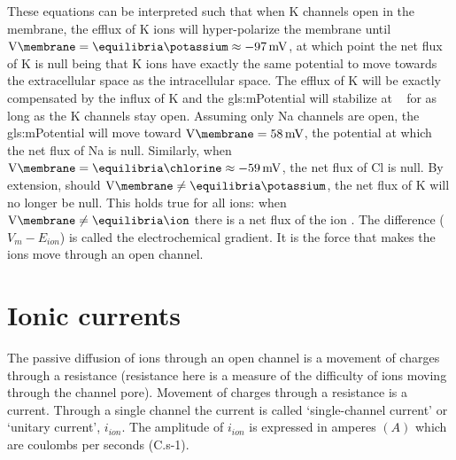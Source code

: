 \documentclass[../../Orator]{subfiles}
\begin{document}
These equations can be interpreted such that when
\gls{K} channels open in the membrane, the efflux of \gls{K} ions will hyper-polarize the membrane until \(\unit{\V\membrane} = \unit{\equilibria\potassium} \approx \qty{-97}{\mV}\), at which point the net flux of \gls{K} is null being that \gls{K} ions have exactly the same potential to move towards the extracellular space as the intracellular space. 
The efflux of \gls{K} will be exactly compensated by the influx of \gls{K} and the \gls{gls:mPotential} will stabilize at \unit{\equilibria\potassium} for as long as the \gls{K} channels stay open. 
Assuming only \gls{Na} channels are open, the \gls{gls:mPotential} will move toward \(\unit{\V\membrane} = \qty{58}{\mV}\), the potential at which the net flux of \gls{Na} is null. 
Similarly, when \(\unit{\V\membrane} = \unit{\equilibria\chlorine} \approx \qty{-59}{\mV}\),  
the net flux of \gls{Cl} is null. 
By extension, should \(\unit{\V\membrane} \neq \unit{\equilibria\potassium}\), the net flux of  \gls{K} will no longer be null. 
This holds true for all ions: when \(\unit{\V\membrane} \neq \unit{\equilibria\ion}\) there is a net flux of the ion \cite{}. The difference (\(V_m-E_{ion}\)) is called the electrochemical gradient. It is the force that makes the ions move through an open channel.

\endgroup

\section{Ionic currents}
The passive diffusion of ions through an open channel is a movement of charges through a resistance (resistance here is a measure of the difficulty of ions moving through the channel pore). Movement of charges through a resistance is a current. Through a single channel the current is called ‘single-channel current’ or ‘unitary current’, \(i_{ion}\). The amplitude of  \(i_{ion}\) is expressed in amperes \((A)\) which are coulombs per seconds (C.s-1). 
\end{document}
